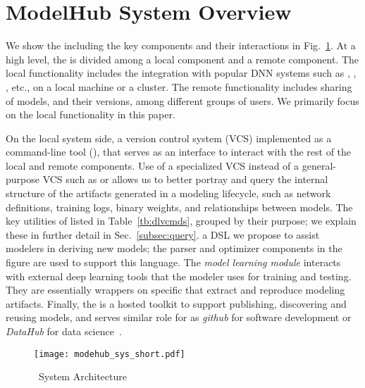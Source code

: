 \documentclass[conference]{IEEEtran}
\begin{document}
\section{ModelHub System Overview}
\label{sec:sys_overview}


We show the \modelhub\architecture including the key components and their interactions in
Fig.~\ref{fig:sys_arch}. 
At a high level, the \modelhub\functionality is divided among a local component and a remote component. The local functionality includes the integration with popular DNN systems such as , , , etc., on a local machine or a cluster. The remote functionality includes sharing of models, and their versions, among different groups of users. We primarily focus on the local functionality in this paper.



On the local system side, \DLV\is a version control system (VCS) implemented as a command-line tool
(\dlv), that serves as an interface to interact with the rest of the local and remote components. Use of a specialized
VCS instead of a general-purpose VCS such as  or  allows us to 
better portray and query the internal structure of the artifacts generated in a modeling lifecycle, such as network
definitions, training logs, binary weights, and relationships between models. The key utilities of
\dlv\are listed in Table~\ref{tb:dlvcmds}, grouped by their purpose; we explain these in further
detail in
Sec.~\ref{subsec:query}. \DQL\is a DSL we propose to assist modelers in deriving new models; the
\DQL\query parser and optimizer components in the figure are used to support this language. The
\emph{model learning module} %
interacts with external deep learning tools
that the modeler uses for training and testing. They are essentially wrappers on specific \dnn\systems that extract and reproduce modeling artifacts. 
Finally, the \modelhub\service is a hosted toolkit to support publishing,
discovering and reusing models, and serves similar role for \dnn\models as \emph{github} for software development or \emph{DataHub} for data science~\cite{datahub}. 




\begin{figure}[!t]
\centering
\texttt{[image: modehub\_sys\_short.pdf]}
\caption{\modelhub\ System Architecture}
\label{fig:sys_arch}
\end{figure}
\end{document}
